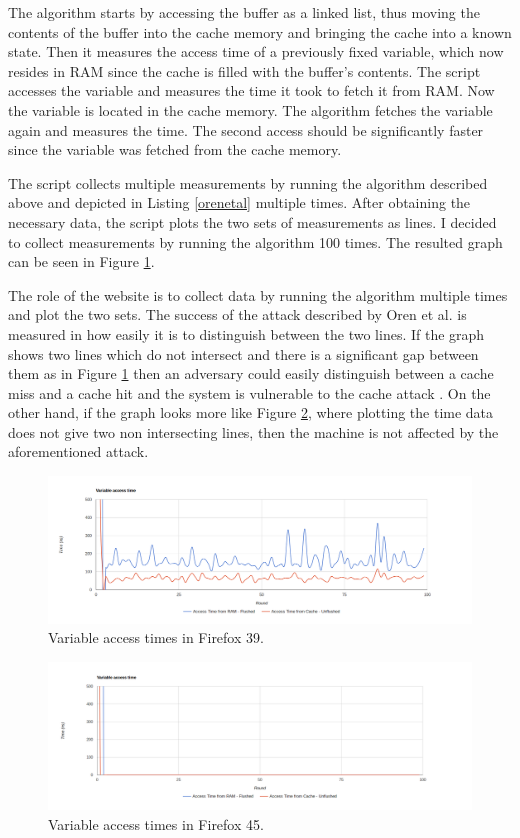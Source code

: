 \documentclass[10pt,a4paper,twoside]{book}
\begin{document}
The algorithm starts by accessing the buffer as a linked list, thus moving the contents of the buffer into the cache memory and bringing the cache into a known state. Then it measures the access time of a previously fixed variable, which now resides in RAM since the cache is filled with the buffer's contents. The script accesses the variable and measures the time it took to fetch it from RAM. Now the variable is located in the cache memory. The algorithm fetches the variable again and measures the time. The second access should be significantly faster since the variable was fetched from the cache memory.

The script collects multiple measurements by running the algorithm described above and depicted in Listing \ref{orenetal} multiple times. After obtaining the necessary data, the script plots the two sets of measurements as lines. I decided to collect measurements by running the algorithm 100 times. The resulted graph can be seen in Figure \ref{firefox39}.

The role of the website is to collect data by running the algorithm multiple times and plot the two sets. The success of the attack described by Oren et al. \cite{oren2015spy} is measured in how easily it is to distinguish between the two lines. If the graph shows two lines which do not intersect and there is a significant gap between them as in Figure \ref{firefox39} then an adversary could easily distinguish between a cache miss and a cache hit and the system is vulnerable to the cache attack \cite{oren2015spy}. On the other hand, if the graph looks more like Figure \ref{firefox45}, where plotting the time data does not give two non intersecting lines, then the machine is not affected by the aforementioned attack.

\begin{figure}[h]
\centering
\includegraphics[width=\textwidth]{figures/firefox39.png}
\caption{Variable access times in Firefox 39.}
\label{firefox39}
\end{figure}

\begin{figure}[h]
\centering
\includegraphics[width=\textwidth]{figures/firefox45.png}
\caption{Variable access times in Firefox 45.}
\label{firefox45}
\end{figure}
\end{document}

